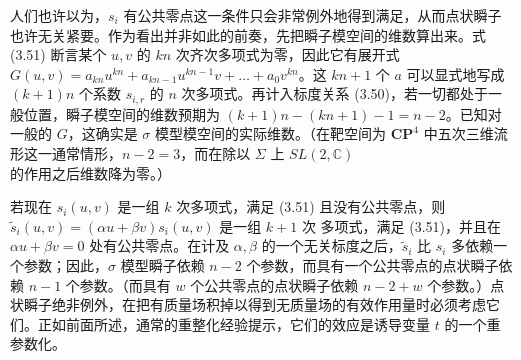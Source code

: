 人们也许以为，$s_i$ 有公共零点这一条件只会非常例外地得到满足，从而点状瞬子也许无关紧要。作为看出并非如此的前奏，先把瞬子模空间的维数算出来。式 (3.51) 断言某个 $u,v$ 的 $kn$ 次齐次多项式为零，因此它有展开式 $G(u,v)=a_{kn}u^{kn}+a_{kn-1}u^{kn-1}v+\ldots+a_0v^{kn}$。这 $kn+1$ 个 $a$ 可以显式地写成 $(k+1)n$ 个系数 $s_{i,r}$ 的 $n$ 次多项式。再计入标度关系 (3.50)，若一切都处于一般位置，瞬子模空间的维数预期为 $(k+1)n-(kn+1)-1=n-2$。已知对一般的 $G$，这确实是 $\sigma$ 模型模空间的实际维数。（在靶空间为 $\mathbf{CP}^4$ 中五次三维流形这一通常情形，$n-2=3$，而在除以 $\Sigma$ 上 $SL(2,\mathbb{C})$ 的作用之后维数降为零。）

若现在 $s_i(u,v)$ 是一组 $k$ 次多项式，满足 (3.51) 且没有公共零点，则 $\tilde s_i(u,v)=(\alpha u+\beta v)s_i(u,v)$ 是一组 $k+1$ 次
\label{op:44}
多项式，满足 (3.51)，并且在 $\alpha u+\beta v=0$ 处有公共零点。在计及 $\alpha,\beta$ 的一个无关标度之后，$\tilde s_i$ 比 $s_i$ 多依赖一个参数；因此，$\sigma$ 模型瞬子依赖 $n-2$ 个参数，而具有一个公共零点的点状瞬子依赖 $n-1$ 个参数。（而具有 $w$ 个公共零点的点状瞬子依赖 $n-2+w$ 个参数。）点状瞬子绝非例外，在把有质量场积掉以得到无质量场的有效作用量时必须考虑它们。正如前面所述，通常的重整化经验提示，它们的效应是诱导变量 $t$ 的一个重参数化。
